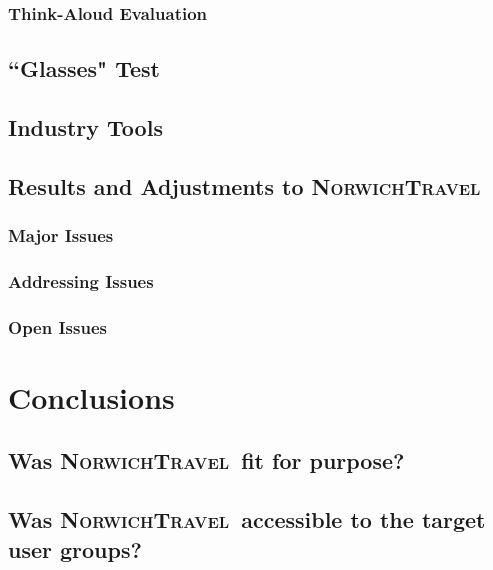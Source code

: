 \documentclass[cmpstyle]{ueacmpstyle}
\newcommand{\nt}{\textsc{NorwichTravel}}
\begin{document}
			\subsubsection{Think-Aloud Evaluation}
			
		\subsection{``Glasses" Test}
		
		\subsection{Industry Tools}
		
		\subsection{Results and Adjustments to \nt}
			
			\subsubsection{Major Issues}
			
			\subsubsection{Addressing Issues}
			
			\subsubsection{Open Issues}
	\section{Conclusions}
	
		\subsection{Was \nt \ fit for purpose?}
		
		\subsection{Was \nt \ accessible to the target user groups?}
	
	
	
\end{document}
